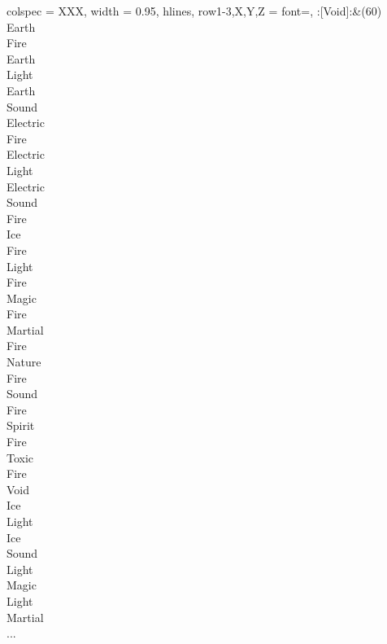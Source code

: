 \begin{longtblr}[
	caption = {2v1 Defending Weak},
	label = {2v1-Defending-Weak},
]{
	colspec = {XXX}, width = 0.95\linewidth,
	hlines,
	row{1-3,X,Y,Z} = {font=\bfseries},
}
	:[Void]:&{(60)\\
	Earth \\
	Fire \\
	Earth \\
	Light \\
	Earth \\
	Sound \\
	Electric \\
	Fire \\
	Electric \\
	Light \\
	Electric \\
	Sound \\
	Fire \\
	Ice \\
	Fire \\
	Light \\
	Fire \\
	Magic \\
	Fire \\
	Martial \\
	Fire \\
	Nature \\
	Fire \\
	Sound \\
	Fire \\
	Spirit \\
	Fire \\
	Toxic \\
	Fire \\
	Void \\
	Ice \\
	Light \\
	Ice \\
	Sound \\
	Light \\
	Magic \\
	Light \\
	Martial \\
	...\\
	}\\


\end{longtblr}
